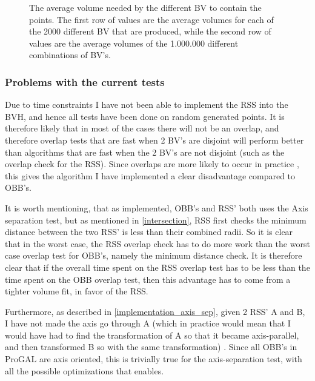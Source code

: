 \begin{figure}[b]

\caption{\label{volume-table} The average volume needed by the
  different BV to contain the points. The first row of values are the average
  volumes for each of the 2000 different BV that are produced, while
  the second row of values are the average volumes of the 1.000.000
  different combinations of BV's.}
\end{figure}

\subsubsection{Problems with the current tests}
\label{test_problems}
Due to time constraints I have not been able to implement the RSS into the BVH, and hence all tests have been done on random generated points. It is therefore likely that in most of the cases there will not be an overlap, and therefore overlap tests that are fast when 2 BV's are disjoint will perform better than algorithms that are fast when the 2 BV's are not disjoint (such as the overlap check for the RSS). Since overlaps are more likely to occur in practice , this gives the algorithm I have implemented a clear disadvantage compared to OBB's.

It is worth mentioning, that as implemented, OBB's and RSS' both uses the Axis separation test, but as mentioned in \ref{intersection}, RSS first checks the minimum distance between the two RSS' is less than their combined radii. So it is clear that in the worst case, the RSS overlap check has to do more work than the worst case overlap test for OBB's, namely the minimum distance check. It is therefore clear that if the overall time spent on the RSS overlap test has to be less than the time spent on the OBB overlap test, then this advantage has to come from a tighter volume fit, in favor of the RSS. 

Furthermore, as described in \ref{implementation_axis_sep}, given 2 RSS' A and B, I have not made the axis go through A (which in practice would mean that I would have had to find the transformation of A so that it became axis-parallel, and then transformed B so with the same transformation) . Since all OBB's in ProGAL are axis oriented, this is trivially true for the axis-separation test, with all the possible optimizations that enables.
